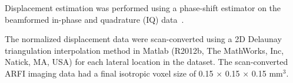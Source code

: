 

Displacement estimation was performed using a phase-shift estimator on the
beamformed in-phase and quadrature (IQ) data~\cite{Loupas95,pinton06}.


The normalized displacement data were scan-converted using a 2D Delaunay
triangulation interpolation method in Matlab (R2012b, The MathWorks, Inc,
Natick, MA, USA) for each lateral location in the dataset.  The scan-converted
ARFI imaging data had a final isotropic voxel size of 0.15 $\times$ 0.15
$\times$ 0.15 mm$^3$.
